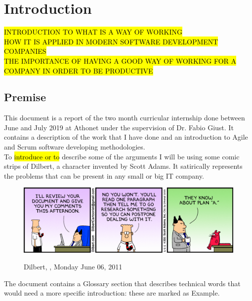 \chapter{Introduction}
\label{introduction}

%
%
%
%

%

\hl{INTRODUCTION TO WHAT IS A WAY OF WORKING\\HOW IT IS APPLIED IN MODERN SOFTWARE DEVELOPMENT COMPANIES\\THE IMPORTANCE OF HAVING A GOOD WAY OF WORKING FOR A COMPANY IN ORDER TO BE PRODUCTIVE}

\section{Premise}
	This document is a report of the two month curricular internship done between June and July 2019 at Athonet under the supervision of Dr. Fabio Giust.
	It contains a description of the work that I have done and an introduction to Agile and Scrum software developing methodologies.\\
	To \hl{introduce or to} describe some of the arguments I will be using some comic strips of Dilbert, a character invented by Scott Adams\cite{dilbert}.
	It satirically represents the problems that can be present in any small or big IT company.
	\begin{figure}[H]
		\centering
		\includegraphics[width=1\textwidth]{resources/Dissertate}\\
		\caption[Dilbert, ]{Dilbert, , Monday June 06, 2011}
	\end{figure}
	The document contains a Glossary section that describes technical words that would need a more specific introduction: these are marked as \gls{Example}.\\
	
